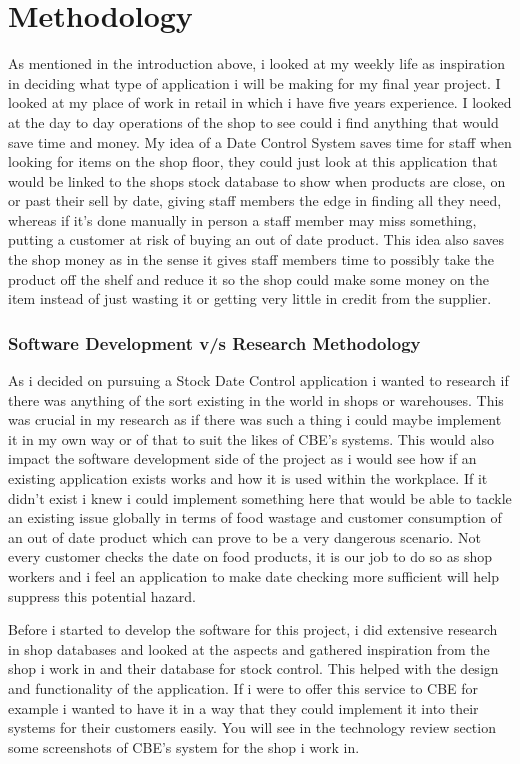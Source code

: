 \chapter{Methodology}
As mentioned in the introduction above, i looked at my weekly life as inspiration in deciding what type of application i will be making for my final year project. I looked at my place of work in retail in which i have five years experience. I looked at the day to day operations of the shop to see could i find anything that would save time and money. My idea of a Date Control System saves time for staff when looking for items on the shop floor, they could just look at this application that would be linked to the shops stock database to show when products are close, on or past their sell by date, giving staff members the edge in finding all they need, whereas if it's done manually in person a staff member may miss something, putting a customer at risk of buying an out of date product. This idea also saves the shop money as in the sense it gives staff members time to possibly take the product off the shelf and reduce it so the shop could make some money on the item instead of just wasting it or getting very little in credit from the supplier.
\newline

\subsection{Software Development v/s Research Methodology}
As i decided on pursuing a Stock Date Control application i wanted to research if there was anything of the sort existing in the world in shops or warehouses. This was crucial in my research as if there was such a thing i could maybe implement it in my own way or of that to suit the likes of CBE's systems. This would also impact the software development side of the project as i would see how if an existing application exists works and how it is used within the workplace. If it didn't exist i knew i could implement something here that would be able to tackle an existing issue globally in terms of food wastage and customer consumption of an out of date product which can prove to be a very dangerous scenario. Not every customer checks the date on food products, it is our job to do so as shop workers and i feel an application to make date checking more sufficient will help suppress this potential hazard.  
\newline

Before i started to develop the software for this project, i did extensive research in shop databases and looked at the aspects and gathered inspiration from the shop i work in and their database for stock control. This helped with the design and functionality of the application. If i were to offer this service to CBE for example i wanted to have it in a way that they could implement it into their systems for their customers easily. You will see in the technology review section some screenshots of CBE's system for the shop i work in. 
\newline

